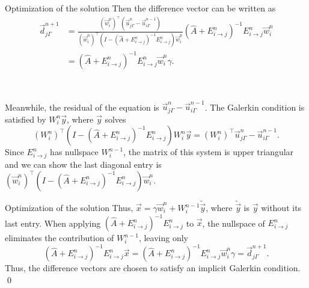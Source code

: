 \documentclass{beamer}
\newcommand{\vecw}{\left ( \vec{w}_i^n \right )^\top}
\newcommand{\Aij}{\left ( \hat{A} + E_{i \to j}^{n} \right )^{-1}}
\newcommand{\AijE}{\Aij E_{i \to j}^{n}}
\begin{document}
\begin{frame}{Optimization of the solution}
Then the difference vector can be written as
\begin{align*}
	\vec{d}_{j \Gamma}^{n+1}
	&= \frac{\vecw \left ( \vec{u}_{j \Gamma}^n - \vec{u}_{i \Gamma}^{n-1} \right )}{\vecw \left ( I - \AijE \right ) \vec{w}_i^n} \AijE \vec{w}_i^n \\
	&= \AijE \vec{w}_i^n \gamma.
\end{align*}

~

Meanwhile, the residual of the equation is $\vec{u}_{j \Gamma}^n - \vec{u}_{i \Gamma}^{n-1}$.
The Galerkin condition is satisfied by $W_i^n \vec{y}$, where $\vec{y}$ solves
\begin{equation*}
	(W_i^n)^\top \left ( I - \AijE \right ) W_i^n \vec{y} = (W_i^n)^\top \vec{u}_{j \Gamma}^n - \vec{u}_{i \Gamma}^{n-1}.
\end{equation*}
Since $E_{i \to j}^n$ has nullspace $W_i^{n-1}$, the matrix of this system is upper triangular and we can show the last diagonal entry is $\vecw (I - \AijE) \vec{w}_i^n$.
\end{frame}

\begin{frame}{Optimization of the solution}
Thus, $\vec{x} = \gamma \vec{w}_i^n + W_i^{n-1} \tilde{\vec{y}}$, where $\tilde{\vec{y}}$ is $\vec{y}$ without its last entry.
When applying $\AijE$ to $\vec{x}$, the nullspace of $E_{i \to j}^n$ eliminates the contribution of $W_i^{n-1}$, leaving only
\begin{equation*}
	\AijE \vec{x} = \AijE \vec{w}_i^n \gamma = \vec{d}_{j \Gamma}^{n+1}.
\end{equation*}
Thus, the difference vectors are chosen to satisfy an implicit Galerkin condition.
\qed
\end{frame}

\end{document}
